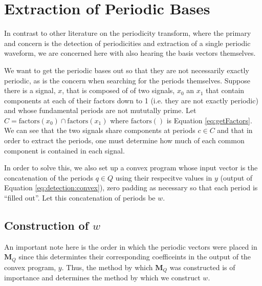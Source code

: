 \chapter{Extraction of Periodic Bases}\label{chap:extraction}

In contrast to other literature on the periodicity transform, where the primary and concern is the detection of periodicities and extraction of a single periodic waveform, we are concerned here with also hearing the basis vectors themselves.

We want to get the periodic bases out so that they are not necessarily exactly periodic, as is the concern when searching for the periods themselves. Suppose there is a signal, $x$, that is composed of of two signals, $x_0$ an $x_1$ that contain components at each of their factors down to 1 (i.e. they are not exactly periodic) and whose fundamental periods are not mututally prime. Let $C = \text{factors}(x_0) \cap \text{factors}(x_1)$ where $\text{factors}()$ is Equation \eqref{eq:getFactors}. We can see that the two signals share components at periods $c \in C$ and that in order to extract the periods, one must determine how much of each common component is contained in each signal.



In order to solve this, we also set up a convex program whose input vector is the concatenation of the periods $q \in Q$ using their respecitve values in $y$ (output of Equation \eqref{eq:detection:convex}), zero padding as necessary so that each period is ``filled out''. Let this concatenation of periods be $w$.

\section{Construction of $w$}
An important note here is the order in which the periodic vectors were placed in $\bm{M}_Q$ since this determintes their corresponding coefficeints in the output of the convex program, $y$. Thus, the method by which $\bm{M}_Q$ was constructed is of importance and determines the method by which we construct $w$.


